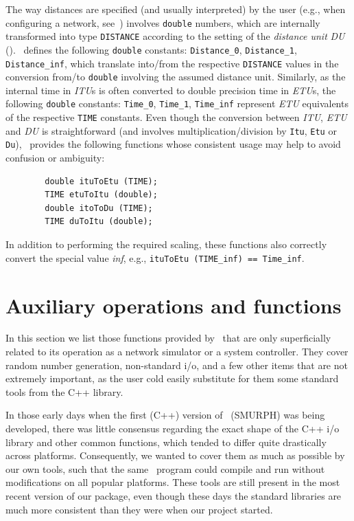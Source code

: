 The way distances are specified (and usually interpreted)
by the user (e.g., when configuring a network,
see~) involves {\tt double} numbers, which are internally
transformed into type {\tt DISTANCE} according to the setting of the
{\em distance unit\/} {\em DU\/} ().
\smurph\ defines the following {\tt double} constants:
{\tt Distance\_0},
{\tt Distance\_1},
{\tt Distance\_inf},
which translate into/from the respective {\tt DISTANCE} values in the
conversion from/to {\tt double} involving the assumed distance unit.
Similarly, as the internal time in {\em ITU\/}s is often converted to 
double precision time in {\em ETU\/}s, the following {\tt double} constants:
{\tt Time\_0},
{\tt Time\_1},
{\tt Time\_inf}
represent {\em ETU\/} equivalents of the respective {\tt TIME} constants.
Even though the conversion between {\em ITU}, {\em ETU\/} and {\em DU\/} is
straightforward (and involves multiplication/division by {\tt Itu}, {\tt Etu}
or {\tt Du}), \smurph\ provides the following functions whose consistent
usage may help to avoid confusion or ambiguity:
\begin{verbatim}
        double ituToEtu (TIME);
        TIME etuToItu (double);
        double itoToDu (TIME);
        TIME duToItu (double);
\end{verbatim}
\noindent
In addition to performing the required scaling, these functions also correctly
convert the special value {\em inf}, e.g.,
{\tt ituToEtu (TIME\_inf) == Time\_inf}.

\section{Auxiliary operations and functions}
\label{rm_au}

In this section we list those functions provided by \smurph\ that are
only superficially related
to its operation as a network simulator or a system controller.
They cover random number generation, non-standard i/o, and a few other
items that are not extremely important, as the user cold easily substitute
for them some standard tools from the C++ library.

In those early days
when the first (C++) version of \smurph\ ({\sc SMURPH}) was being developed,
there was little consensus regarding the exact shape of the C++ i/o library
and other common functions, which tended to differ
quite drastically across platforms.
Consequently, we wanted to cover them as much as possible by our own tools,
such that the same \smurph\ program could compile and run
without modifications on all popular platforms.
These tools are still present in the most recent version of our package,
even though these days the standard libraries are much more consistent than they were when our project started.

